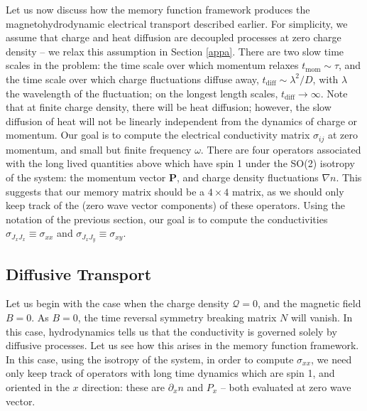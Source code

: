 \documentclass[10pt, oneside]{book}
\begin{document}
\begin{doublespace}
Let us now discuss how the memory function framework produces the magnetohydrodynamic electrical transport described earlier.   For simplicity, we assume that charge and heat diffusion are decoupled processes at zero charge density -- we relax this assumption in Section \ref{appa}.    There are two slow time scales in the problem:  the time scale over which momentum relaxes $t_{\mathrm{mom}} \sim \tau$, and the time scale over which charge fluctuations diffuse away, $t_{\mathrm{diff}} \sim \lambda^2/D$, with $\lambda$ the wavelength of the fluctuation; on the longest length scales, $t_{\mathrm{diff}}\rightarrow \infty$.   Note that at finite charge density, there will be heat diffusion;  however, the slow diffusion of heat will not be linearly independent from the dynamics of charge or momentum.   Our goal is to compute the electrical conductivity matrix $\sigma_{ij}$ at zero momentum, and small but finite frequency $\omega$.   There are four operators associated with the long lived quantities above which have spin 1 under the SO(2) isotropy of the system:  the momentum vector $\mathbf{P}$, and charge density fluctuations $\nabla n$.    This suggests that our memory matrix should be a $4\times 4$ matrix, as we should only keep track of the (zero wave vector components) of these operators.   Using the notation of the previous section, our goal is to compute the conductivities $\sigma_{J_xJ_x} \equiv \sigma_{xx}$  and $\sigma_{J_xJ_y} \equiv \sigma_{xy}$.  

\subsection{Diffusive Transport}
\label{sec:diffusive}

Let us begin with the case when the charge density $\mathcal{Q}=0$, and the magnetic field $B=0$.   As $B=0$, the time reversal symmetry breaking matrix $N$ will vanish.   In this case, hydrodynamics tells us that the conductivity is governed solely by diffusive processes.  Let us see how this arises in the memory function framework.   In this case, using the isotropy of the system, in order to compute $\sigma_{xx}$, we need only keep track of operators with long time dynamics which are spin 1, and oriented in the $x$ direction:   these are $\partial_x n$ and $P_x$ -- both evaluated at zero wave vector.


\end{doublespace}
\end{document}
